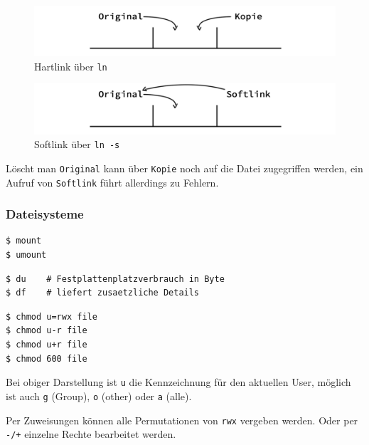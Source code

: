 	\begin{figure}[hp]
		\caption{Hartlink über \texttt{ln}}
		\includegraphics[width=\textwidth]{workfiles/u1_1}
	\end{figure}
	
	\begin{figure}[hp]
		\caption{Softlink über \texttt{ln -s}}
		\includegraphics[width=\textwidth]{workfiles/u1_2}
	\end{figure}

	Löscht man \texttt{Original} kann über \texttt{Kopie} noch auf die Datei zugegriffen werden, ein
	Aufruf von \texttt{Softlink} führt allerdings zu Fehlern.


	\subsubsection*{Dateisysteme} %
	\label{ssub:dateisysteme}
	
	\begin{lstlisting}
$ mount
$ umount
	\end{lstlisting}

	\begin{lstlisting}
$ du	# Festplattenplatzverbrauch in Byte
$ df	# liefert zusaetzliche Details
	\end{lstlisting}

	\begin{lstlisting}
$ chmod u=rwx file
$ chmod u-r file
$ chmod u+r file
$ chmod 600 file
	\end{lstlisting}
	
	Bei obiger Darstellung ist \texttt{u} die Kennzeichnung für den aktuellen User, möglich ist auch
	\texttt{g} (Group), \texttt{o} (other) oder \texttt{a} (alle).

	Per Zuweisungen können alle	Permutationen von \texttt{rwx} vergeben werden. Oder per \texttt{-/+} einzelne
	Rechte bearbeitet werden.

